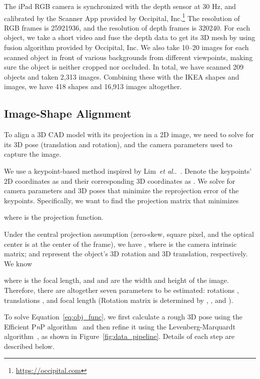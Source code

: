 \documentclass[10pt,twocolumn,letterpaper]{article}
\makeatletter
\newcommand{\eqn}[1]{Equation~\ref{#1}}
\newcommand{\fig}[1]{Figure~\ref{#1}}
\DeclareRobustCommand\onedot{\futurelet\@let@token\@onedot}
\def\@onedot{\ifx\@let@token.\else.\null\fi\xspace}
\def\etal{\emph{et al}\onedot}
\makeatother
\begin{document}
The iPad RGB camera is synchronized with the depth sensor at 30 Hz, and calibrated by the Scanner App provided by Occipital, Inc.\footnote{\url{https://occipital.com}} The resolution of RGB frames is 25921936, and the resolution of depth frames is 320240. For each object, we take a short video and fuse the depth data to get its 3D mesh by using fusion algorithm provided by Occipital, Inc. We also take 10--20 images for each scanned object in front of various backgrounds from different viewpoints, making sure the object is neither cropped nor occluded. In total, we have scanned 209 objects and taken 2,313 images. Combining these with the IKEA shapes and images, we have 418 shapes and 16,913 images altogether.

\subsection{Image-Shape Alignment}

To align a 3D CAD model with its projection in a 2D image, we need to solve for its 3D pose (translation and rotation), and the camera parameters used to capture the image. 

We use a keypoint-based method inspired by Lim~\etal~\cite{Lim2013Parsing}. Denote the keypoints' 2D coordinates as  and their corresponding 3D coordinates as . We solve for camera parameters and 3D poses that minimize the reprojection error of the keypoints. Specifically, we want to find the projection matrix  that minimizes
\vspace{-5pt}
 
where  is the projection function. 

Under the central projection assumption (zero-skew, square pixel, and the optical center is at the center of the frame), we have , where  is the camera intrinsic matrix;  and  represent the object's 3D rotation and 3D translation, respectively. We know

where  is the focal length, and  and  are the width and height of the image. Therefore, there are altogether seven parameters to be estimated: rotations , translations , and focal length  (Rotation matrix  is determined by , , and ). 

To solve \eqn{eq:obj_func}, we first calculate a rough 3D pose using the Efficient P\textit{n}P algorithm~\cite{lepetit2009epnp} and then refine it using the Levenberg-Marquardt algorithm~\cite{levenberg1944method, marquardt1963algorithm}, as shown in \fig{fig:data_pipeline}. Details of each step are described below.
\end{document}
